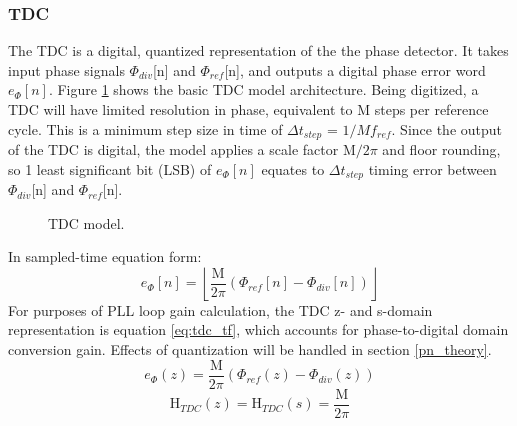 \subsubsection{TDC}
	The TDC is a digital, quantized representation of the the phase detector. It takes input phase signals $\Phi_{div}$[n] and $\Phi_{ref}$[n], and outputs a digital phase error word $e_\Phi[n]$. Figure \ref{fig:tdc} shows the basic TDC model architecture. Being digitized, a TDC will have limited resolution in phase, equivalent to M steps per reference cycle. This is a minimum step size in time of $\Delta t_{step}$ = $1/Mf_{ref}$. Since the output of the TDC is digital, the model applies a scale factor M$/2\pi$ and floor rounding, so 1 least significant bit (LSB) of $e_\Phi[n]$ equates to $\Delta t_{step}$ timing error  between $\Phi_{div}$[n] and $\Phi_{ref}$[n].
	\begin{figure}[htb!]
		\center
		\caption{TDC model.}
		\label{fig:tdc}
	\end{figure}
	\FloatBarrier
	In sampled-time equation form:
	\begin{equation}
		e_\Phi[n] = \left\lfloor\frac{\mathrm{M}}{2\pi}(\Phi_{ref}[n] - \Phi_{div}[n])\right\rfloor
	\end{equation}
	For purposes of PLL loop gain calculation, the TDC z- and s-domain representation is equation \ref{eq:tdc_tf}, which accounts for phase-to-digital domain conversion gain. Effects of quantization will be handled in section \ref{pn_theory}.
	\begin{equation}
		e_\Phi(z) = \frac{\mathrm{M}}{2\pi}(\Phi_{ref}(z) - \Phi_{div}(z))
	\end{equation}	
	\begin{equation}\label{eq:tdc_tf}
		\mathrm{H}_{TDC}(z) = \mathrm{H}_{TDC}(s) = \frac{\mathrm{M}}{2\pi}
	\end{equation}	
	\FloatBarrier


